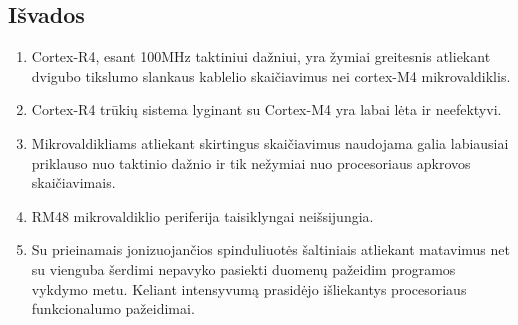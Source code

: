 \documentclass[a4paper, 12pt]{article} %
\begin{document}
\begin{onehalfspacing}
\section{I\v{s}vados}


\begin{enumerate}
\item Cortex-R4, esant 100MHz taktiniui da\v{z}niui, yra \v{z}ymiai greitesnis atliekant dvigubo tikslumo slankaus kablelio skai\v{c}iavimus nei cortex-M4 mikrovaldiklis.
\item Cortex-R4 tr\=uki\k{u} sistema lyginant su Cortex-M4 yra labai l\.{e}ta ir neefektyvi.
\item Mikrovaldikliams atliekant skirtingus skai\v{c}iavimus naudojama galia labiausiai priklauso nuo taktinio da\v{z}nio ir tik ne\v{z}ymiai nuo procesoriaus apkrovos skai\v{c}iavimais.
\item RM48 mikrovaldiklio periferija taisiklyngai nei\v{s}sijungia.
\item Su prieinamais jonizuojan\v{c}ios spinduliuot\.{e}s \v{s}altiniais atliekant matavimus net su vienguba \v{s}erdimi nepavyko pasiekti duomen\k{u} pa\v{z}eidim programos vykdymo metu. Keliant intensyvum\k{a} prasid\.{e}jo i\v{s}liekantys procesoriaus funkcionalumo pa\v{z}eidimai.
\end{enumerate}


\newpage





\end{onehalfspacing}
\end{document}
